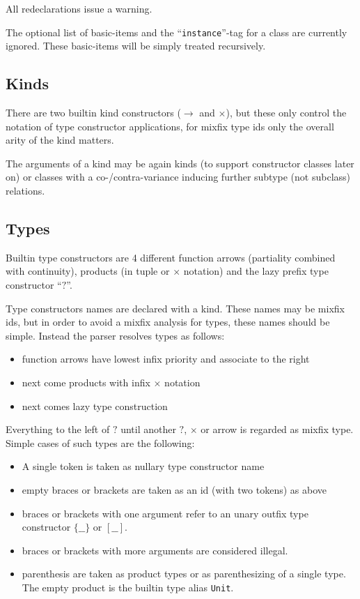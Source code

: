\documentclass{article}
\begin{document}
All redeclarations issue a warning.

The optional list of basic-items and the ``\texttt{instance}''-tag for a class
are currently ignored. These basic-items will be simply treated recursively.

\subsection{Kinds}

There are two builtin kind constructors ($\to$ and $\times$), but these only
control the notation of type constructor applications, for mixfix type ids
only the overall arity of the kind matters. 

The arguments of a kind may be again kinds (to support constructor classes
later on) or classes with a co-/contra-variance inducing further subtype
(not subclass) relations. 

\subsection{Types}

Builtin type constructors are 4 different function arrows (partiality combined
with continuity), products (in tuple or $\times$ notation) and the lazy
prefix type constructor ``$?$''.

Type constructors names are declared with a kind. These names may be mixfix
ids, but in order to avoid a mixfix analysis for types, these names should be
simple. Instead the parser resolves types as follows:

\begin{itemize}
\item function arrows have lowest infix priority and associate to the right
\item next come products with infix $\times$ notation
\item next comes lazy type construction
\end{itemize}

Everything to the left of $?$ until another $?$, $\times$ or arrow is regarded
as mixfix type. Simple cases of such types are the following:

\begin{itemize}
\item A single token is taken as nullary type constructor name
\item empty braces or brackets are taken as an id (with two tokens) as above
\item braces or brackets with one argument refer to an unary outfix type
  constructor $\{\_\_\}$ or $[\_\_]$.
\item braces or brackets with more arguments are considered illegal.
\item parenthesis are taken as product types or as parenthesizing of a single
  type. The empty product is the builtin type alias \texttt{Unit}.
\end{itemize}
\end{document}
